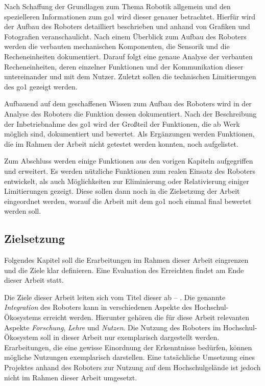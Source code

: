 Nach Schaffung der Grundlagen zum Thema Robotik allgemein und den spezielleren Informationen zum \gls{go1} wird dieser
genauer betrachtet.
Hierfür wird der Aufbau des Roboters detailliert beschrieben und anhand von Grafiken und Fotografien veranschaulicht.
Nach einem Überblick zum Aufbau des Roboters werden die verbauten mechanischen Komponenten, die Sensorik und die Recheneinheiten
dokumentiert.
Darauf folgt eine genaue Analyse der verbauten Recheneinheiten, deren einzelner Funktionen und der Kommunikation dieser
untereinander und mit dem Nutzer.
Zuletzt sollen die technischen Limitierungen des \gls{go1} gezeigt werden.

Aufbauend auf dem geschaffenen Wissen zum Aufbau des Roboters wird in der Analyse des Roboters die Funktion dessen
dokumentiert.
Nach der Beschreibung der Inbetriebnahme des \gls{go1} wird der Großteil der Funktionen, die ab Werk möglich sind,
dokumentiert und bewertet.
Als Ergänzungen werden Funktionen, die im Rahmen der Arbeit nicht getestet werden konnten, noch aufgelistet.

Zum Abschluss werden einige Funktionen aus den vorigen Kapiteln aufgegriffen und erweitert.
Es werden nützliche Funktionen zum realen Einsatz des Roboters entwickelt, als auch Möglichkeiten zur Eliminierung oder
Relativierung einiger Limitierungen gezeigt.
Diese sollen dann noch in die Zielsetzung der Arbeit eingeordnet werden, worauf die Arbeit mit dem \gls{go1} noch einmal
final bewertet werden soll.

\subsection{Zielsetzung}
\label{subsec:zielsetzung}

Folgendes Kapitel soll die Erarbeitungen im Rahmen dieser Arbeit eingrenzen und die Ziele klar definieren.
Eine Evaluation des Erreichten findet am Ende dieser Arbeit statt.


Die Ziele dieser Arbeit leiten sich vom Titel dieser ab -- \emph{\mytitle}.
Die genannte \emph{Integration} des Roboters kann in verschiedenen Aspekte des Hochschul-Ökosystems erreicht werden.
Hierunter gehören die für diese Arbeit relevanten Aspekte \emph{Forschung}, \emph{Lehre} und \emph{Nutzen}.
Die Nutzung des Roboters im Hochschul-Ökosystem soll in dieser Arbeit nur exemplarisch dargestellt werden.
Erarbeitungen, die eine gewisse Einordnung der Erkenntnisse bedürfen, können mögliche Nutzungen exemplarisch darstellen.
Eine tatsächliche Umsetzung eines Projektes anhand des Roboters zur Nutzung auf dem Hochschulgelände ist jedoch nicht
im Rahmen dieser Arbeit umgesetzt.

